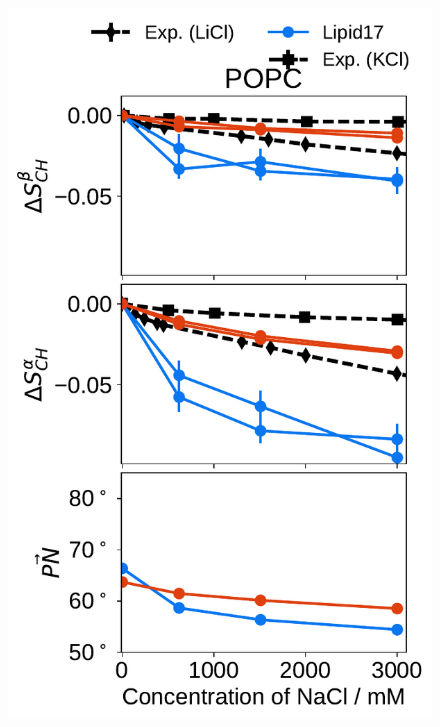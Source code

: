 \documentclass[journal=jpcbfk,manuscript=article]{achemso}
\newlength{\figheight}
\begin{document}
 
\begin{figure}[tbp!] 
  \centering 
  \includegraphics[height=\figheight]{../img/ecc_pops/order_parameters_changes_ecc-lip_L14_A-B-PN-COO_POPC_nacl.pdf} 

\end{figure}
\end{document}
